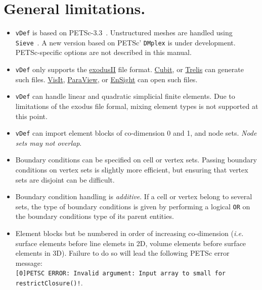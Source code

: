 \documentclass[10pt,oneside]{memoir}
\def\vDef{{\texttt{vDef}} }
\begin{document}
\section{General limitations.}
\begin{itemize}
\item \vDef is based on PETSc-3.3~\cite{petsc-efficient,petsc-user-ref,petsc-web-page}. Unstructured meshes are handled using \texttt{Sieve}~\cite{Knepley-Karpeev-2009a}. A new version based on PETSc' \texttt{DMplex} is under development. PETSc-specific options are not described in this manual.
\item \vDef only supports the \href{http://sourceforge.net/projects/exodusii/}{exodusII} file format. \href{http://cubit.sandia.gov}{Cubit}, or \href{http://www.csimsoft.com/trelis.jsp}{Trelis} can generate such files. \href{https://wci.llnl.gov/codes/visit/}{VisIt}, \href{http://paraview.org}{ParaView}, or \href{http://www.ceisoftware.com}{EnSight} can open such files.
\item \vDef can handle linear and quadratic simplicial finite elements. Due to limitations of the exodus file formal, mixing element types is not supported at this point.
\item \vDef can import element blocks of co-dimension 0 and 1, and node sets. \emph{Node sets may not overlap}.
\item Boundary conditions can be specified on cell or vertex sets. Passing boundary conditions on vertex sets is slightly more efficient, but ensuring that vertex sets are disjoint can be difficult.
\item Boundary condition handling is \emph{additive}. If a cell or vertex belong to several sets, the type of boundary conditions is given by performing a logical \verb+OR+ on the boundary conditions type of its parent entities. 
\item Element blocks but be numbered in order of increasing co-dimension (\emph{i.e.} surface elements before line elemets in 2D, volume elements before surface elements in 3D). Failure to do so will lead the following PETSc error message:\\
\verb+[0]PETSC ERROR: Invalid argument: Input array to small for restrictClosure()!+.
\end{itemize}
\end{document}
